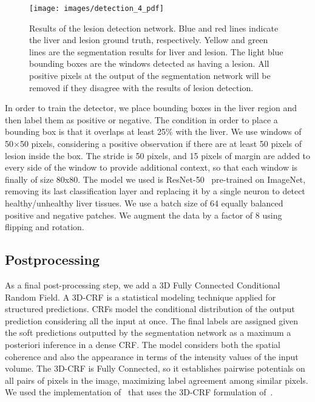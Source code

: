 \documentclass{article}
\begin{document}
\begin{figure}[h!]
  \centering
  \texttt{[image: images/detection\_4\_pdf]}
  \caption[Visualizations of detections]{Results of the lesion detection network. Blue and red lines indicate the liver and lesion ground truth, respectively. Yellow and green lines are the segmentation results for liver and lesion. The light blue bounding boxes are the windows detected as having a lesion. All positive pixels at the output of the segmentation network will be removed if they disagree with the results of lesion detection.}
  \label{Image:detector}
\end{figure}

In order to train the detector, we place bounding boxes in the liver region and then label them as positive or negative.  The condition in order to place a bounding box is that it overlaps at least 25\% with the liver. We use windows of 50$\times$50 pixels, considering a positive observation if there are at least 50 pixels of lesion inside the box. The stride is 50 pixels, and 15 pixels of margin are added to every side of the window to provide additional context, so that each window is finally of size 80x80. The model we used is ResNet-50~\cite{he2016deep} pre-trained on ImageNet, removing its last classification layer and replacing it by a single neuron to detect healthy/unhealthy liver tissues. We use a batch size of 64 equally balanced positive and negative patches. We augment the data by a factor of 8 using flipping and rotation. 

\subsection{Postprocessing}

As a final post-processing step, we add a 3D Fully Connected Conditional Random Field. A 3D-CRF is a statistical modeling technique applied for structured predictions. CRFs model the conditional distribution of the output prediction considering all the input at once. The final labels are assigned given the soft predictions outputted by the segmentation network as a maximum a posteriori inference in a dense CRF. The model considers both the spatial coherence and also the appearance in terms of the intensity values of the input volume. The 3D-CRF is Fully Connected, so it establishes pairwise potentials on all pairs of pixels in the image, maximizing label agreement among similar pixels. We used the implementation of~\cite{christ2017automatic} that uses the 3D-CRF formulation of~\cite{krahenbuhl2011efficient}.
\end{document}
